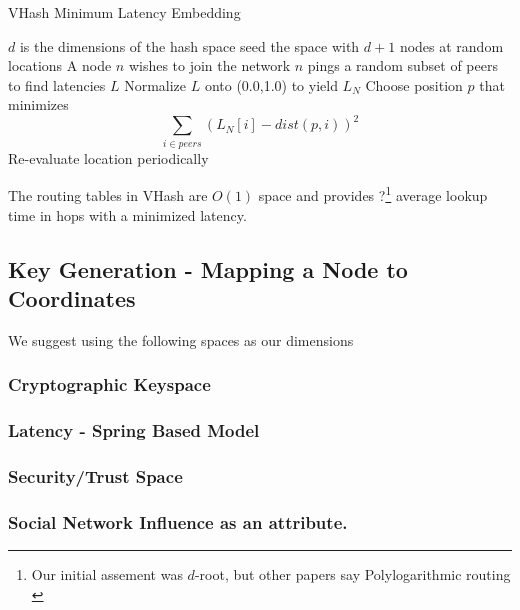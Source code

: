 \documentclass{IEEEtran}
\begin{document}
\begin{algorithm}
\caption{VHash Minimum Latency Embedding}
\label{latency}
\begin{algorithmic}[1]  %
	\STATE $d$ is the dimensions of the hash space
    \STATE seed the space with $d+1$ nodes at random locations
   	\STATE A node $n$ wishes to join the network
    \STATE $n$ pings a random subset of peers to find latencies $L$
    \STATE Normalize $L$ onto (0.0,1.0) to yield $L_N$
    \STATE Choose position $p$ that minimizes $$\sum\limits_{i\in peers}(L_N[i]-dist(p,i))^2$$ 
    \STATE Re-evaluate location periodically
\end{algorithmic}
\end{algorithm}



The routing tables in VHash are $O(1)$ space and provides ?\footnote{Our initial assement was $d$-root, but other papers say 
Polylogarithmic routing \cite{kleinberg2000navigation} \cite{raynet}} average lookup time in hops with a minimized latency.





\subsection{Key Generation - Mapping a Node to Coordinates}

We suggest using the following spaces as our dimensions

\subsubsection{Cryptographic Keyspace}

\subsubsection{Latency - Spring Based Model}

\subsubsection{Security/Trust Space}

\subsubsection{Social Network Influence as an attribute.}
\end{document}
